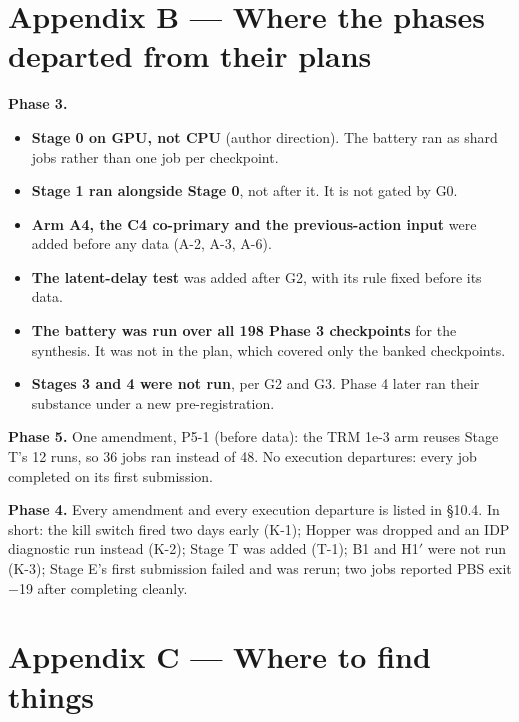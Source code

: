 \documentclass[11pt]{article}
\begin{document}
\section*{Appendix B --- Where the phases departed from their plans}



\textbf{Phase 3.}

\begin{itemize}
\item \textbf{Stage 0 on GPU, not CPU} (author direction). The battery ran as shard jobs rather than one job per checkpoint.
\item \textbf{Stage 1 ran alongside Stage 0}, not after it. It is not gated by G0.
\item \textbf{Arm A4, the C4 co-primary and the previous-action input} were added before any data (A-2, A-3, A-6).
\item \textbf{The latent-delay test} was added after G2, with its rule fixed before its data.
\item \textbf{The battery was run over all 198 Phase 3 checkpoints} for the synthesis. It was not in the plan, which covered only the banked checkpoints.
\item \textbf{Stages 3 and 4 were not run}, per G2 and G3. Phase 4 later ran their substance under a new pre-registration.
\end{itemize}



\textbf{Phase 5.} One amendment, P5-1 (before data): the TRM 1e-3 arm reuses Stage T's 12 runs, so 36 jobs ran instead of 48. No execution departures: every job completed on its first submission.



\textbf{Phase 4.} Every amendment and every execution departure is listed in \S{}10.4. In short: the kill switch fired two days early (K-1); Hopper was dropped and an IDP diagnostic run instead (K-2); Stage T was added (T-1); B1 and H1$'$ were not run (K-3); Stage E's first submission failed and was rerun; two jobs reported PBS exit $-$19 after completing cleanly.



\section*{Appendix C --- Where to find things}
\end{document}
